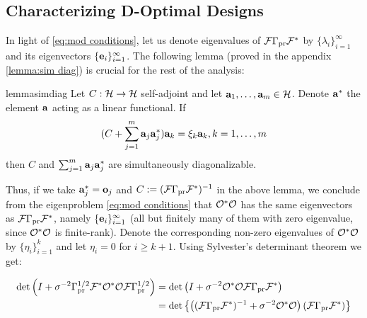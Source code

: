 \documentclass{amsart}
\numberwithin{equation}{section}
\begin{document}
\subsection{Characterizing D-Optimal Designs}\label{subsec:characterization}
In light of \eqref{eq:mod conditions}, let us denote eigenvalues of
$\mathcal{F} \Gamma_{\textup{pr}} \mathcal{F}^*$ by $\{\lambda_i\}_{i=1}^{\infty}$ and its
eigenvectors $\{\mathbf{e}_i\}_{i=1}^{\infty}$. The following lemma (proved
in the appendix \ref{lemma:sim diag}) is crucial for the rest of the
analysis:

\begin{restatable*}{lemma}{simdiag}\label{lemma:sim diag}
  Let $C:\mathcal{H} \to \mathcal{H}$ self-adjoint and let $\mathbf{a}_1,\dots,\mathbf{a}_m \in
  \mathcal{H}$. Denote $\mathbf{a}^*$ the element $\mathbf{a}$ acting as a linear
  functional. If
  \begin{equation*}
   (C + \sum_{j=1}^m \mathbf{a}_j\mathbf{a}_j^*) \mathbf{a}_k = \xi_k \mathbf{a}_k, k = 1,\dots,m
  \end{equation*}
  then $C$ and $\sum_{j=1}^m \mathbf{a}_j \mathbf{a}_j^*$ are simultaneously
  diagonalizable.
\end{restatable*}

Thus, if we take $\mathbf{a}_j^{*} = \mathbf{o}_j$ and $C := (\mathcal{F} \Gamma_{\textup{pr}}
\mathcal{F}^*)^{-1}$ in the above lemma, we conclude from the eigenproblem
\eqref{eq:mod conditions} that $\mathcal{O}^*\mathcal{O}$ has the same eigenvectors
as $\mathcal{F} \Gamma_{\textup{pr}} \mathcal{F}^*$, namely $\{\mathbf{e}_i\}_{i=1}^{\infty}$ (all but
finitely many of them with zero eigenvalue, since $\mathcal{O}^*\mathcal{O}$ is
finite-rank). Denote the corresponding non-zero eigenvalues of
$\mathcal{O}^*\mathcal{O}$ by $\{\eta_i\}_{i=1}^{k}$ and let $\eta_i = 0$ for $i
\geq k+1$. Using Sylvester's determinant theorem we get:

\begin{align}\label{eq:pre manipulations}
  \begin{split}
    \det \left (I + \sigma^{-2} \Gamma_{\textup{pr}}^{1/2} \mathcal{F} ^* \mathcal{O}^*
    \mathcal{O} \mathcal{F} \Gamma_{\textup{pr}}^{1/2}\right ) &=
    \det \left (I + \sigma^{-2} \mathcal{O}^*
    \mathcal{O} \mathcal{F} \Gamma_{\textup{pr}}\mathcal{F}^* \right ) \\
    &= \det \left \{ \left ( (\mathcal{F} \Gamma_{\textup{pr}} \mathcal{F}^*)^{-1} +
    \sigma^{-2}\mathcal{O}^*\mathcal{O} \right ) (\mathcal{F} \Gamma_{\textup{pr}} \mathcal{F}^*)\right \}\\
  \end{split}
\end{align}
\end{document}
